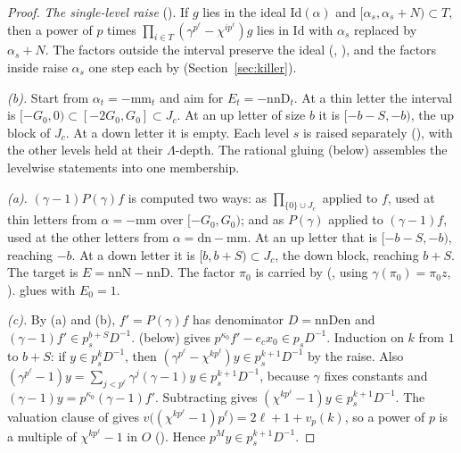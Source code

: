 \documentclass[11pt]{article}
\theoremstyle{definition}
\theoremstyle{remark}
\begin{document}
\begin{proof}
\emph{The single-level raise} (). If $g$ lies in the ideal $\mathrm{Id}(\alpha)$ and $[\alpha_s,\alpha_s+N)\subset T$, then a power of $p$ times $\prod_{i\in T}(\gamma^{p^\ell}-\chi^{ip^\ell})g$ lies in $\mathrm{Id}$ with $\alpha_s$ replaced by $\alpha_s+N$. The factors outside the interval preserve the ideal (, ), and the factors inside raise $\alpha_s$ one step each by  (Section~\ref{sec:killer}).

\emph{(b).} Start from $\alpha_t=-\mathrm{mm}_t$ and aim for $E_t=-\mathrm{nnD}_t$. At a thin letter the interval is $[-G_0,0)\subset[-2G_0,G_0]\subset J_c$. At an up letter of size $b$ it is $[-b-S,-b)$, the up block of $J_c$. At a down letter it is empty. Each level $s$ is raised separately (), with the other levels held at their $\Lambda$-depth. The rational gluing  (below) assembles the levelwise statements into one membership.

\emph{(a).} $(\gamma-1)P(\gamma)f$ is computed two ways: as $\prod_{\{0\}\cup J_c}$ applied to $f$, used at thin letters from $\alpha=-\mathrm{mm}$ over $[-G_0,G_0)$; and as $P(\gamma)$ applied to $(\gamma-1)f$, used at the other letters from $\alpha=\mathrm{dn}-\mathrm{mm}$. At an up letter that is $[-b-S,-b)$, reaching $-b$. At a down letter it is $[b,b+S)\subset J_c$, the down block, reaching $b+S$. The target is $E=\mathrm{nnN}-\mathrm{nnD}$. The factor $\pi_0$ is carried by  (, using $\gamma(\pi_0)=\pi_0z$, ).  glues with $E_0=1$.

\emph{(c).} By (a) and (b), $f'=P(\gamma)f$ has denominator $D=\mathrm{nnDen}$ and $(\gamma-1)f'\in p_s^{b+S}D^{-1}$.  (below) gives $p^{\kappa_0}f'-e_cx_0\in p_sD^{-1}$. Induction on $k$ from $1$ to $b+S$: if $y\in p_s^kD^{-1}$, then $(\gamma^{p^\ell}-\chi^{kp^\ell})y\in p_s^{k+1}D^{-1}$ by the raise. Also $(\gamma^{p^\ell}-1)y=\sum_{j<p^\ell}\gamma^j(\gamma-1)y\in p_s^{k+1}D^{-1}$, because $\gamma$ fixes constants and $(\gamma-1)y=p^{\kappa_0}(\gamma-1)f'$. Subtracting gives $(\chi^{kp^\ell}-1)y\in p_s^{k+1}D^{-1}$. The valuation clause of  gives $v\bigl((\chi^{kp^\ell}-1)p^\ell\bigr)=2\ell+1+v_p(k)$, so a power of $p$ is a multiple of $\chi^{kp^\ell}-1$ in $O$ (). Hence $p^My\in p_s^{k+1}D^{-1}$.
\end{proof}
\end{document}
